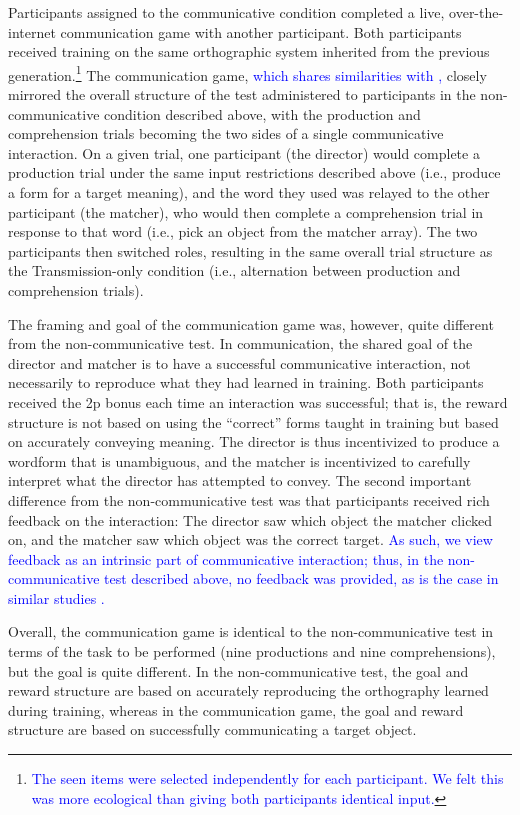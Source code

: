 \documentclass[doc,biblatex]{apa7}
\newcommand\newmaterial[1]{\textcolor{blue}{#1}}
\begin{document}
Participants assigned to the communicative condition completed a live, over-the-internet communication game with another participant. Both participants received training on the same orthographic system inherited from the previous generation.\footnote{\newmaterial{The seen items were selected independently for each participant. We felt this was more ecological than giving both participants identical input.}} The communication game, \newmaterial{which shares similarities with \textcite{Kirby:2015},} closely mirrored the overall structure of the test administered to participants in the non-communicative condition described above, with the production and comprehension trials becoming the two sides of a single communicative interaction. On a given trial, one participant (the director) would complete a production trial under the same input restrictions described above (i.e., produce a form for a target meaning), and the word they used was relayed to the other participant (the matcher), who would then complete a comprehension trial in response to that word (i.e., pick an object from the matcher array). The two participants then switched roles, resulting in the same overall trial structure as the Transmission-only condition (i.e., alternation between production and comprehension trials).

The framing and goal of the communication game was, however, quite different from the non-communicative test. In communication, the shared goal of the director and matcher is to have a successful communicative interaction, not necessarily to reproduce what they had learned in training. Both participants received the 2p bonus each time an interaction was successful; that is, the reward structure is not based on using the ``correct'' forms taught in training but based on accurately conveying meaning. The director is thus incentivized to produce a wordform that is unambiguous, and the matcher is incentivized to carefully interpret what the director has attempted to convey. The second important difference from the non-communicative test was that participants received rich feedback on the interaction: The director saw which object the matcher clicked on, and the matcher saw which object was the correct target. \newmaterial{As such, we view feedback as an intrinsic part of communicative interaction; thus, in the non-communicative test described above, no feedback was provided, as is the case in similar studies \parencite{Carr:2017, Motamedi:2019, Saldana:2019, Silvey:2019}.}

Overall, the communication game is identical to the non-communicative test in terms of the task to be performed (nine productions and nine comprehensions), but the goal is quite different. In the non-communicative test, the goal and reward structure are based on accurately reproducing the orthography learned during training, whereas in the communication game, the goal and reward structure are based on successfully communicating a target object.
\end{document}
